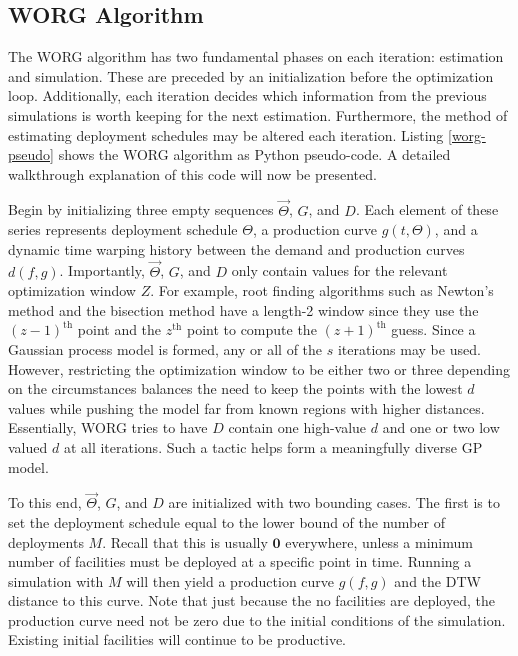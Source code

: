 \subsection{WORG Algorithm}
\label{algo}

The WORG algorithm has two fundamental phases on each iteration:
estimation and simulation.  These are preceded by an initialization 
before the optimization loop. Additionally, each iteration decides 
which information from the previous simulations is worth keeping for the
next estimation. Furthermore, the method of estimating deployment 
schedules may be altered each iteration.  Listing \ref{worg-pseudo}
shows the WORG algorithm as Python pseudo-code. A detailed walkthrough 
explanation of this code will now be presented.

Begin by initializing three empty sequences $\vec{\Theta}$, $G$, and $D$.
Each element of these series represents deployment schedule $\Theta$, 
a production curve $g(t, \Theta)$, and a dynamic time warping history 
between the demand and production curves $d(f, g)$.
Importantly, $\vec{\Theta}$, $G$, and $D$ only contain values for
the relevant optimization window $Z$. For example, root finding algorithms
such as Newton's method and the bisection method have a length-2 window
since they use the $(z-1)^\mathrm{th}$ point and the $z^\mathrm{th}$ point
to compute the $(z+1)^\mathrm{th}$ guess. Since a Gaussian process model is 
formed, any or all of the $s$ iterations may be used. However, 
restricting the optimization window to be either two or three depending on 
the 
circumstances balances the need to keep the points with the lowest $d$ 
values while pushing the model far from known regions with higher 
distances. Essentially, WORG tries to have $D$ contain one high-value $d$
and one or two low valued $d$ at all iterations. Such a tactic helps
form a meaningfully diverse GP model.

To this end, $\vec{\Theta}$, $G$, and $D$ are initialized with two 
bounding cases. The first is to set the deployment schedule equal to the
lower bound of the number of deployments $M$.  Recall that this is 
usually $\mathbf{0}$ everywhere, unless a minimum number of facilities 
must be deployed at a specific point in time. Running a simulation with 
$M$ will then yield a production curve $g(f, g)$ and the DTW distance to
this curve.  Note that just because the no facilities are deployed, the 
production curve need not be zero due to the initial conditions of the 
simulation. Existing initial facilities will continue to be productive. 


